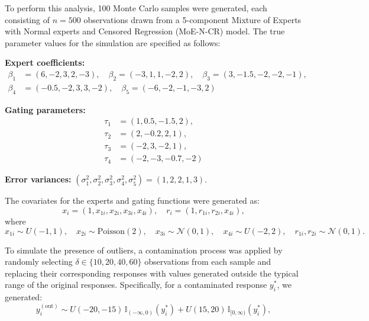 \documentclass[10.5pt]{article} %
\begin{document}
\vspace{1em}

\noindent
To perform this analysis, 100 Monte Carlo samples were generated, each consisting of $n = 500$ observations drawn from a 5-component Mixture of Experts with Normal experts and Censored Regression (MoE-N-CR) model. The true parameter values for the simulation are specified as follows:

\newpage

\noindent
\textbf{Expert coefficients:}
\begin{align*}
\beta_1 &= (6, -2, 3, 2, -3),\quad 
\beta_2 = (-3, 1, 1, -2, 2),\quad 
\beta_3 = (3, -1.5, -2, -2, -1),\\
\beta_4 &= (-0.5, -2, 3, 3, -2),\quad 
\beta_5 = (-6, -2, -1, -3, 2)
\end{align*}

\vspace{1em}

\noindent
\textbf{Gating parameters:}
\begin{align*}
\tau_1 &= (1, 0.5, -1.5, 2), \\
\tau_2 &= (2, -0.2, 2, 1), \\
\tau_3 &= (-2, 3, -2, 1), \\
\tau_4 &= (-2, -3, -0.7, -2)
\end{align*}

\vspace{1em}

\noindent
\textbf{Error variances:} \quad $(\sigma_1^2, \sigma_2^2, \sigma_3^2, \sigma_4^2, \sigma_5^2) = (1, 2, 2, 1, 3)$.

\vspace{1em}

\noindent
The covariates for the experts and gating functions were generated as:
\[
x_i = (1, x_{1i}, x_{2i}, x_{3i}, x_{4i}), \quad r_i = (1, r_{1i}, r_{2i}, x_{4i}),
\]
where
\[
x_{1i} \sim U(-1,1), \quad x_{2i} \sim \text{Poisson}(2), \quad x_{3i} \sim \mathcal{N}(0,1), \quad x_{4i} \sim U(-2,2), \quad r_{1i}, r_{2i} \sim \mathcal{N}(0,1).
\]

\vspace{1em}

\noindent
To simulate the presence of outliers, a contamination process was applied by randomly selecting $\delta \in \{10, 20, 40, 60\}$ observations from each sample and replacing their corresponding responses with values generated outside the typical range of the original responses. Specifically, for a contaminated response $y_i^*$, we generated:
\[
y_i^{(\text{out})} \sim U(-20,-15)\,\mathbb{I}_{(-\infty,0)}(y_i^*) + U(15,20)\,\mathbb{I}_{[0,\infty)}(y_i^*),
\]
\end{document}

